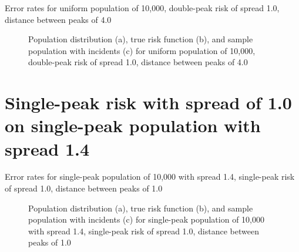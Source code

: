 
\begin{table}[H]
    
    \caption[]{Error rates for uniform population of 10,000, double-peak risk of \gls{spread} 1.0, distance between peaks of 4.0}
    \label{tab:mean_error_rates:unif_100_1_2h_4}
\end{table}

\begin{figure}[H]
    
    \caption[]{Population distribution (a), true risk function (b), and sample population with incidents (c) for uniform population of 10,000, double-peak risk of \gls{spread} 1.0, distance between peaks of 4.0}
    \label{fig:distributions:unif_100_1_2h_4}    
\end{figure}

\section{Single-peak risk with spread of 1.0 on single-peak population with spread 1.4}
\label{sec:app:results_p1.4_100_1_1h_X}


\begin{table}[H]
    
    \caption[]{Error rates for single-peak population of 10,000 with \gls{spread} 1.4, single-peak risk of \gls{spread} 1.0, distance between peaks of 1.0}
    \label{tab:mean_error_rates:p1.4_100_1_1h_1s}
\end{table}

\begin{figure}[H]
    
    \caption[]{Population distribution (a), true risk function (b), and sample population with incidents (c) for single-peak population of 10,000 with \gls{spread} 1.4, single-peak risk of \gls{spread} 1.0, distance between peaks of 1.0}
    \label{fig:distributions:p1.4_100_1_1h_1s}    
\end{figure}


